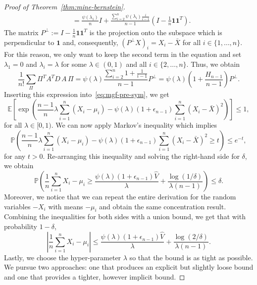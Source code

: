 \documentclass[aos]{imsart2}
\theoremstyle{plain}
\theoremstyle{definition}
\newcommand{\one}{\mathbf{1}}
\newcommand{\PR}{\mathbb{P}}
\newcommand{\E}{\mathbb{E}}
\newcommand{\xb}{\bar{X}}
\newcommand{\vh}{\hat{V}}
\begin{document}
\begin{appendix}
\begin{proof}[Proof of Theorem~\ref{thm:mine-bernstein}]
\begin{align*}
        &=\frac{\psi(\lambda_1)}{n}I + \frac{\sum_{i=2}^n \psi(\lambda_i) \frac{i}{i-1}}{n-1}\left(I-\frac{1}{n}\one\one^T\right).
    \end{align*}
    The matrix $P^\perp:= I-\frac{1}{n}\one\one^T$ is the projection onto the subspace which is perpendicular to $\one$ and, consequently, $(P^\perp X)_i = X_i-\xb$ for all $i \in \{1,\ldots,n\}$. For this reason, we only want to keep the second term in the equation and set $\lambda_1 = 0$ and $\lambda_i = \lambda$ for some $\lambda \in (0,1)$ and all $i\in\{2,\ldots,n\}$. Thus, we obtain
    \begin{equation*}
        \frac{1}{n!} \sum_{\Pi} \Pi^T A^T D\, A\, \Pi
        =  \psi(\lambda) \frac{\sum_{i=2}^n 1+ \frac{1}{i-1}}{n-1} P^\perp
        = \psi(\lambda) \left(1+\frac{H_{n-1}}{n-1}\right) P^\perp.
    \end{equation*}
    Inserting this expression into~\eqref{eq:mgf-pre-sym}, we get
    \begin{equation}
        \E\left[\exp\left(\frac{n-1}{n}\lambda \sum_{i=1}^n(X_i-\mu_i)-\psi(\lambda)(1+\epsilon_{n-1})\sum_{i=1}^n(X_i-\bar{X})^2\right)\right] \leq 1,
    \end{equation}
    for all $\lambda \in [0,1)$. We can now apply Markov's inequality which implies
    \begin{equation*}
        \PR\left(\frac{n-1}{n}\lambda \sum_{i=1}^n(X_i-\mu_i)-\psi(\lambda)(1+\epsilon_{n-1})\sum_{i=1}^n(X_i-\bar{X})^2 \geq t\right) \leq e^{-t},
    \end{equation*}
    for any $t > 0$. Re-arranging this inequality and solving the right-hand side for $\delta$, we obtain
    \begin{equation*}
        \PR\left(\frac{1}{n}\sum_{i=1}^n X_i - \mu_i \geq \frac{\psi(\lambda)(1+\epsilon_{n-1})\vh}{\lambda} + \frac{\log(1/\delta)}{\lambda(n-1)}\right) \leq \delta.
    \end{equation*}
    Moreover, we notice that we can repeat the entire derivation for the random variables $-X_i$ with means $-\mu_i$ and obtain the same concentration result. Combining the inequalities for both sides with a union bound, we get that with probability $1-\delta$,
    \begin{equation}\label{eq:bound-lambda}
        \left\vert\frac{1}{n}\sum_{i=1}^n X_i - \mu_i\right\vert \leq \frac{\psi(\lambda)(1+\epsilon_{n-1})\vh}{\lambda} + \frac{\log(2/\delta)}{\lambda(n-1)}.
    \end{equation}
    Lastly, we choose the hyper-parameter $\lambda$ so that the bound is as tight as possible. We pursue two approaches: one that produces an explicit but slightly loose bound and one that provides a tighter, however implicit bound.
    

\end{proof}
\end{appendix}
\end{document}
